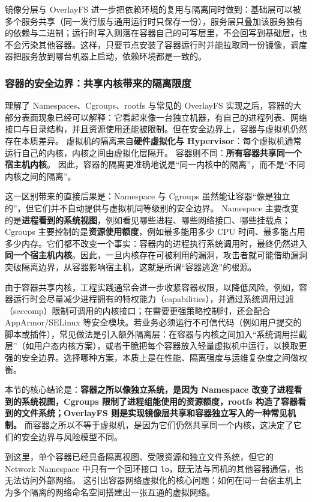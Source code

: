 镜像分层与 OverlayFS 进一步把依赖环境的复用与隔离同时做到：基础层可以被多个服务共享（同一发行版与通用运行时只保存一份），服务层只叠加该服务独有的依赖与二进制；运行时写入则落在容器自己的可写层里，不会回写到基础层，也不会污染其他容器。这样，只要节点安装了容器运行时并能拉取同一份镜像，调度器把服务放到哪台机器上启动，依赖环境都是一致的。

\subsubsection{容器的安全边界：共享内核带来的隔离限度}

理解了 Namespaces、Cgroups、rootfs 与常见的 OverlayFS 实现之后，容器的大部分表面现象已经可以解释：它看起来像一台独立机器，有自己的进程列表、网络接口与目录结构，并且资源使用还能被限制。但在安全边界上，容器与虚拟机仍然存在本质差异。
虚拟机的隔离来自\textbf{硬件虚拟化与 Hypervisor}：每个虚拟机通常运行自己的内核，内核之间由虚拟化层隔开。
容器则不同：\textbf{所有容器共享同一个宿主机内核}。
因此，容器的隔离更准确地说是“同一内核中的隔离”，而不是“不同内核之间的隔离”。

这一区别带来的直接后果是：Namespace 与 Cgroups 虽然能让容器“像是独立的”，但它们并不自动提供与虚拟机同等级别的安全边界。
Namespace 主要改变的是\textbf{进程看到的系统视图}，例如看见哪些进程、哪些网络接口、哪些挂载点；Cgroups 主要控制的是\textbf{资源使用额度}，例如最多能用多少 CPU 时间、最多能占用多少内存。它们都不改变一个事实：容器内的进程执行系统调用时，最终仍然进入\textbf{同一个宿主机内核}。因此，一旦内核存在可被利用的漏洞，攻击者就可能借助漏洞突破隔离边界，从容器影响宿主机，这就是所谓“容器逃逸”的根源。

由于容器共享内核，工程实践通常会进一步收紧容器权限，以降低风险。例如，容器运行时会尽量减少进程拥有的特权能力（capabilities），并通过系统调用过滤（seccomp）限制可调用的内核接口；在需要更强策略控制时，还会配合 AppArmor/SELinux 等安全模块。若业务必须运行不可信代码（例如用户提交的脚本或插件），常见做法是引入额外隔离层：在容器与内核之间加入“系统调用拦截层”（如用户态内核方案），或者干脆把每个容器放入轻量虚拟机中运行，以换取更强的安全边界。选择哪种方案，本质上是在性能、隔离强度与运维复杂度之间做权衡。

本节的核心结论是：\textbf{容器之所以像独立系统，是因为 Namespace 改变了进程看到的系统视图，Cgroups 限制了进程组能使用的资源额度，rootfs 构造了容器看到的文件系统；OverlayFS 则是实现镜像层共享和容器独立写入的一种常见机制。}
而容器之所以不等于虚拟机，是因为它们仍然共享同一个内核，这决定了它们的安全边界与风险模型不同。

到这里，单个容器已经具备隔离视图、受限资源和独立文件系统，但它的 Network Namespace 中只有一个回环接口 \texttt{lo}，既无法与同机的其他容器通信，也无法访问外部网络。
这引出容器网络虚拟化的核心问题：如何在同一台宿主机上为多个隔离的网络命名空间搭建出一张互通的虚拟网络。


